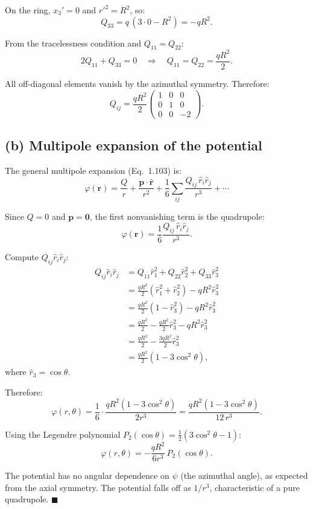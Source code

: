 \documentclass[12pt]{article}
\newcommand{\vect}[1]{\mathbf{#1}}
\begin{document}
On the ring, $x_3' = 0$ and $r'^2 = R^2$, so:
\[
Q_{33} = q\,(3\cdot 0 - R^2) = -qR^2.
\]

From the tracelessness condition and $Q_{11} = Q_{22}$:
\[
2Q_{11} + Q_{33} = 0 \quad \Longrightarrow \quad Q_{11} = Q_{22} = \frac{qR^2}{2}.
\]

All off-diagonal elements vanish by the azimuthal symmetry. Therefore:
\[
\boxed{Q_{ij} = \frac{qR^2}{2}\begin{pmatrix} 1 & 0 & 0 \\ 0 & 1 & 0 \\ 0 & 0 & -2 \end{pmatrix}}.
\]

\subsection*{(b) Multipole expansion of the potential}

The general multipole expansion (Eq.~1.103) is:
\[
\varphi(\vect{r}) = \frac{Q}{r} + \frac{\vect{p}\cdot\hat{\vect{r}}}{r^2} + \frac{1}{6}\sum_{ij}\frac{Q_{ij}\,\hat{r}_i\hat{r}_j}{r^3} + \cdots
\]

Since $Q = 0$ and $\vect{p} = \vect{0}$, the first nonvanishing term is the quadrupole:
\[
\varphi(\vect{r}) = \frac{1}{6}\frac{Q_{ij}\,\hat{r}_i\hat{r}_j}{r^3}.
\]

Compute $Q_{ij}\hat{r}_i\hat{r}_j$:
\begin{align}
Q_{ij}\hat{r}_i\hat{r}_j &= Q_{11}\hat{r}_1^2 + Q_{22}\hat{r}_2^2 + Q_{33}\hat{r}_3^2 \\
&= \frac{qR^2}{2}(\hat{r}_1^2 + \hat{r}_2^2) - qR^2\hat{r}_3^2 \\
&= \frac{qR^2}{2}(1 - \hat{r}_3^2) - qR^2\hat{r}_3^2 \\
&= \frac{qR^2}{2} - \frac{qR^2}{2}\hat{r}_3^2 - qR^2\hat{r}_3^2 \\
&= \frac{qR^2}{2} - \frac{3qR^2}{2}\hat{r}_3^2 \\
&= \frac{qR^2}{2}(1 - 3\cos^2\theta),
\end{align}
where $\hat{r}_3 = \cos\theta$.

Therefore:
\[
\varphi(r,\theta) = \frac{1}{6}\cdot\frac{qR^2(1 - 3\cos^2\theta)}{2r^3} = \frac{qR^2(1 - 3\cos^2\theta)}{12\,r^3}.
\]

Using the Legendre polynomial $P_2(\cos\theta) = \frac{1}{2}(3\cos^2\theta - 1)$:
\[
\boxed{\varphi(r,\theta) = -\frac{qR^2}{6r^3}\,P_2(\cos\theta)}.
\]

The potential has no angular dependence on $\psi$ (the azimuthal angle), as expected from the axial symmetry. The potential falls off as $1/r^3$, characteristic of a pure quadrupole. \hfill $\blacksquare$
\end{document}
